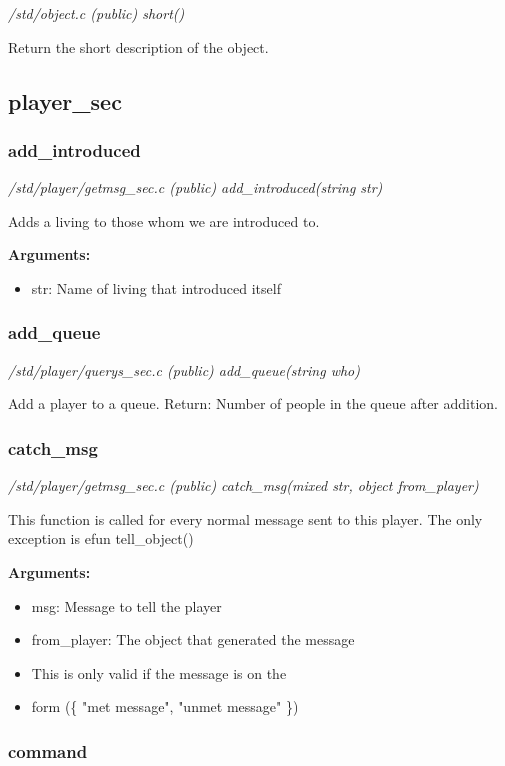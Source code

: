 {\em /std/object.c (public) short()}

Return the short description of the object.


\subsection{player\_sec}
\subsubsection{add\_introduced}

{\em /std/player/getmsg\_sec.c (public) add\_introduced(string str)}

Adds a living to those whom we are introduced to.

{\bf Arguments:}
\begin{itemize}
\item      str: Name of living that introduced itself
\end{itemize}


\subsubsection{add\_queue}

{\em /std/player/querys\_sec.c (public) add\_queue(string who)}

Add a player to a queue.
Return:   Number of people in the queue after addition.


\subsubsection{catch\_msg}

{\em /std/player/getmsg\_sec.c (public) catch\_msg(mixed str, object from\_player)}

This function is called for every normal message sent
to this player. The only exception is efun tell\_object()

{\bf Arguments:}
\begin{itemize}
\item      msg:       Message to tell the player
\item from\_player: The object that generated the message
\item This is only valid if the message is on the
\item form (\{ "met message", "unmet message" \})
\end{itemize}


\subsubsection{command}

